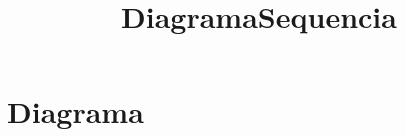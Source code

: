 \documentclass{article}
\begin{document}
\title{DiagramaSequencia}
\maketitle
\tableofcontents

\section{Diagrama}

\end{document}
